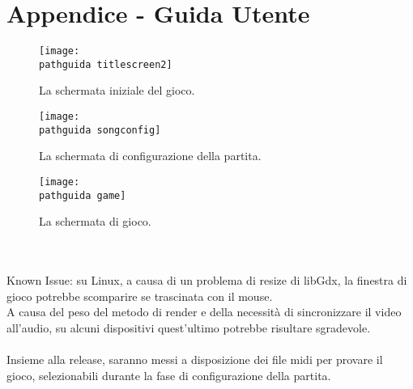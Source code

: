 \documentclass[a4paper,12pt]{report}
\newcommand\pathguida{img/guidautente/}
\begin{document}
\chapter{Appendice - Guida Utente}
\begin{figure}[!htb]
	\centerline{\texttt{[image: \\pathguida titlescreen2]}}
	\caption{La schermata iniziale del gioco.}
	\label{img:title}
\end{figure}
\clearpage \hfill\break
\begin{figure}[!htb]
	\centerline{\texttt{[image: \\pathguida songconfig]}}
	\caption{La schermata di configurazione della partita.}
	\label{img:select}
\end{figure}
\clearpage \hfill\break
\begin{figure}[!htb]
	\centerline{\texttt{[image: \\pathguida game]}}
	\caption{La schermata di gioco.}
	\label{img:game}
\end{figure} \\ \\
Known Issue: su Linux, a causa di un problema di resize di libGdx, la finestra di gioco potrebbe scomparire se trascinata con il mouse. \\ A causa del peso del metodo di render e della necessità di sincronizzare il video all'audio, su alcuni dispositivi quest'ultimo potrebbe risultare sgradevole. \\ \\ Insieme alla release, saranno messi a disposizione dei file midi per provare il gioco, selezionabili durante la fase di configurazione della partita.
\end{document}
